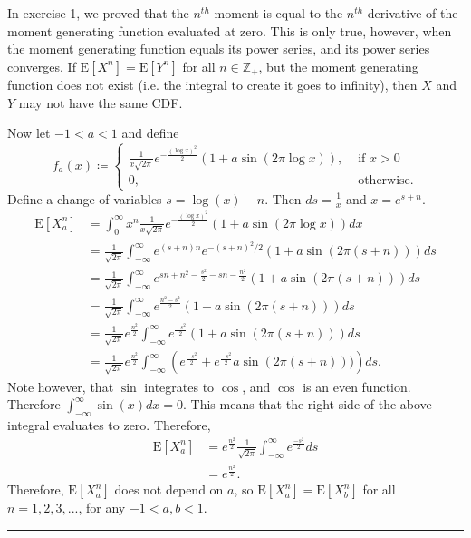 \documentclass{article}
\theoremstyle{break}
\newenvironment{solution}{{\bf Solution:}}{\hfill\rule{2mm}{2mm}}
\newcommand{\E}{\mathrm{E}}
\newcommand{\Z}{\mathbb{Z}}
\begin{document}
\begin{solution}
In exercise 1, we proved that the $n^{th}$ moment is equal to the $n^{th}$ derivative of the moment generating function evaluated at zero. 
This is only true, however, when the moment generating function equals its power series, and its power series converges. If $\E[X^n] = \E[Y^n]$ for all $n \in \Z_+$, but the moment generating function does not exist (i.e. the integral to create it goes to infinity), then $X$ and $Y$ may not have the same CDF.


Now let $-1 < a < 1$ and define
\[ f_a(x) \coloneqq \begin{cases}
\frac{1}{x \sqrt{2 \pi}} e^{- \frac{(\log x )^2}{2}} (1 + a \sin(2\pi \log x)), & \text{ if } x > 0 \\
0, & \text{ otherwise.}
\end{cases}
\]
Define a change of variables $s = \log(x) - n$. Then $ds = \frac{1}{x}$ and $x = e^{s+n}$.
\begin{align*}
\E[X^n_a] &= \int_0^\infty x^n \frac{1}{x \sqrt{2 \pi}} e^{- \frac{(\log x )^2}{2}} (1 + a \sin(2\pi \log x)) dx \\
&= \frac{1}{\sqrt{2 \pi}} \int_{-\infty}^\infty e^{(s+n)n} e^{-(s+n)^2/2} (1 + a \sin (2 \pi (s+n))) ds \\
&= \frac{1}{\sqrt{2 \pi}} \int_{-\infty}^\infty e^{sn + n^2 - \frac{s^2}{2} -sn - \frac{n^2}{2}} (1 + a \sin (2 \pi (s+n))) ds \\
&= \frac{1}{\sqrt{2 \pi}} \int_{-\infty}^\infty e^{\frac{n^2 - s^2}{2}} (1 + a \sin (2 \pi (s+n))) ds \\
&= \frac{1}{\sqrt{2 \pi}} e^{\frac{n^2}{2}} \int_{-\infty}^\infty e^{\frac{- s^2}{2}} (1 + a \sin (2 \pi (s+n))) ds \\
&= \frac{1}{\sqrt{2 \pi}} e^{\frac{n^2}{2}} \int_{-\infty}^\infty \left( e^{\frac{- s^2}{2}} +  e^{\frac{- s^2}{2}} a \sin (2 \pi (s+n))) \right) ds.
\end{align*}
Note however, that $\sin$ integrates to $\cos$, and $\cos$ is an even function. Therefore $\int_{-\infty}^\infty \sin(x) dx = 0$. This means that the right side of the above integral evaluates to zero.
Therefore,
\begin{align*}
\E[X^n_a] &= e^{\frac{n^2}{2}} \frac{1}{\sqrt{2 \pi}}  \int_{-\infty}^\infty e^{\frac{- s^2}{2}} ds \\
&= e^{\frac{n^2}{2}}.
\end{align*}
Therefore, $\E[X^n_a] $ does not depend on $a$, so $\E[X_a^n] = \E[X_b^n]$ for all $n = 1,2,3,...$, for any $ -1 < a,b < 1$.
\end{solution}
\end{document}

